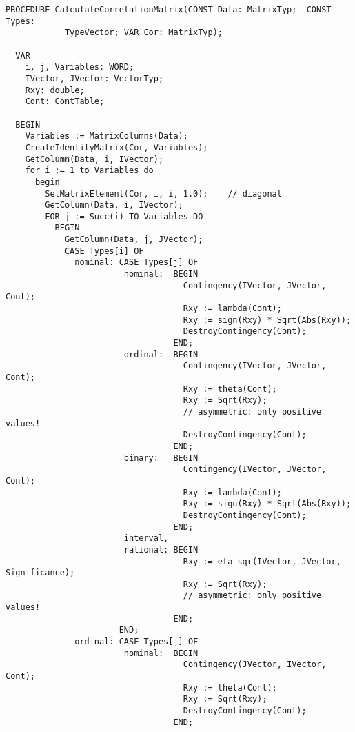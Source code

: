 \begin{lstlisting}[caption=Calculate the correlation matrix]
  PROCEDURE CalculateCorrelationMatrix(CONST Data: MatrixTyp;  CONST Types:
            TypeVector; VAR Cor: MatrixTyp);

  VAR
    i, j, Variables: WORD;
    IVector, JVector: VectorTyp;
    Rxy: double;
    Cont: ContTable;

  BEGIN
    Variables := MatrixColumns(Data);
    CreateIdentityMatrix(Cor, Variables);
    GetColumn(Data, i, IVector);
    for i := 1 to Variables do
      begin
        SetMatrixElement(Cor, i, i, 1.0);    // diagonal
        GetColumn(Data, i, IVector);
        FOR j := Succ(i) TO Variables DO
          BEGIN
            GetColumn(Data, j, JVector);
            CASE Types[i] OF
              nominal: CASE Types[j] OF
                        nominal:  BEGIN
                                    Contingency(IVector, JVector, Cont);
                                    Rxy := lambda(Cont);
                                    Rxy := sign(Rxy) * Sqrt(Abs(Rxy));
                                    DestroyContingency(Cont);
                                  END;
                        ordinal:  BEGIN
                                    Contingency(IVector, JVector, Cont);
                                    Rxy := theta(Cont);
                                    Rxy := Sqrt(Rxy);
                                    // asymmetric: only positive values!
                                    DestroyContingency(Cont);
                                  END;
                        binary:   BEGIN
                                    Contingency(IVector, JVector, Cont);
                                    Rxy := lambda(Cont);
                                    Rxy := sign(Rxy) * Sqrt(Abs(Rxy));
                                    DestroyContingency(Cont);
                                  END;
                        interval,
                        rational: BEGIN
                                    Rxy := eta_sqr(IVector, JVector, Significance);
                                    Rxy := Sqrt(Rxy);
                                    // asymmetric: only positive values!
                                  END;
                       END;
              ordinal: CASE Types[j] OF
                        nominal:  BEGIN
                                    Contingency(JVector, IVector, Cont);
                                    Rxy := theta(Cont);
                                    Rxy := Sqrt(Rxy);
                                    DestroyContingency(Cont);
                                  END;

\end{lstlisting}
